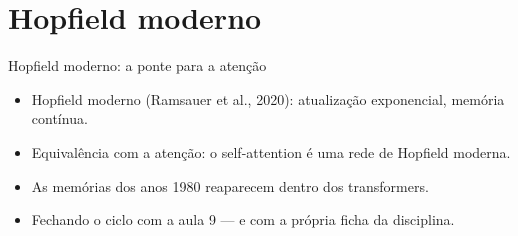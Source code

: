 \documentclass[aspectratio=169, 11pt]{beamer}
\begin{document}
\section{Hopfield moderno}

\begin{frame}{Hopfield moderno: a ponte para a atenção}
  \begin{itemize}\setlength{\itemsep}{0.4ex}
    \item Hopfield moderno (Ramsauer et al., 2020): atualização exponencial,
          memória contínua.
    \item Equivalência com a atenção: o self-attention é uma rede de Hopfield
          moderna.
    \item As memórias dos anos 1980 reaparecem dentro dos transformers.
    \item Fechando o ciclo com a aula 9 — e com a própria ficha da
          disciplina.
  \end{itemize}
\end{frame}
\end{document}
